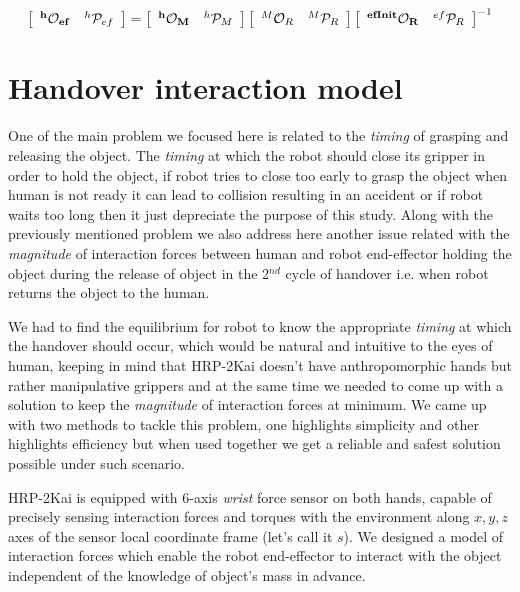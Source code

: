 \begin{gather}\label{X_efinit_hori}
\left[\begin{array}{cc}
\bf{{}^{h}\mathcal{O}_{ef}} & {}^{h}\mathcal{P}_{ef}
\end{array}\right] =
\left[\begin{array}{cc}
\bf{{}^{h}\mathcal{O}_M} & {}^{h}\mathcal{P}_M
\end{array}\right]
\left[\begin{array}{cc}
{}^{M}\mathcal{O}_R & {}^{M}\mathcal{P}_R
\end{array}\right]
\left[\begin{array}{cc}
\bf{{}^{efInit}\mathcal{O}_{R}} & {}^{ef}\mathcal{P}_{R}
\end{array}\right]^{-1}
\end{gather}


\section{Handover interaction model}\label{interaction model}

One of the main problem we focused here is related to the \textit{timing} of grasping and releasing the object. The \textit{timing} at which the robot should close its gripper in order to hold the object, if robot tries to close too early to grasp the object when human is not ready it can lead to collision resulting in an accident or if robot waits too long then it just depreciate the purpose of this study. Along with the previously mentioned problem we also address here another issue related with the \textit{magnitude} of interaction forces between human and robot end-effector holding the object during the release of object in the 2$^{nd}$ cycle of handover i.e. when robot returns the object to the human.


We had to find the equilibrium for robot to know the appropriate \textit{timing} at which the handover should occur, which would be natural and intuitive to the eyes of human, keeping in mind that HRP-2Kai doesn't have anthropomorphic hands but rather manipulative grippers and at the same time we needed to come up with a solution to keep the \textit{magnitude} of interaction forces at minimum. We came up with two methods to tackle this problem, one highlights simplicity and other highlights efficiency but when used together we get a reliable and safest solution possible under such scenario.


HRP-2Kai is equipped with 6-axis \textit{wrist} force sensor on both hands, capable of precisely sensing interaction forces and torques with the environment along $x, y, z$ axes of the sensor local coordinate frame (let's call it $s$). We designed a model of interaction forces which enable the robot end-effector to interact with the object independent of the knowledge of object's mass in advance.

